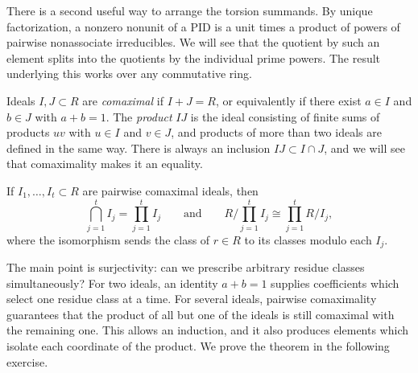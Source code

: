 \documentclass[12pt,reqno]{amsart}
\begin{document}
There is a second useful way to arrange the torsion summands. By unique factorization, a nonzero nonunit of a PID is a unit times a product of powers of pairwise nonassociate irreducibles. We will see that the quotient by such an element splits into the quotients by the individual prime powers. The result underlying this works over any commutative ring.

Ideals $I,J\subset R$ are \emph{comaximal} if $I+J=R$, or equivalently if there exist $a\in I$ and $b\in J$ with $a+b=1$. The \emph{product} $IJ$ is the ideal consisting of finite sums of products $uv$ with $u\in I$ and $v\in J$, and products of more than two ideals are defined in the same way. There is always an inclusion $IJ\subset I\cap J$, and we will see that comaximality makes it an equality.

\begin{theorem}
If $I_1,\ldots,I_t\subset R$ are pairwise comaximal ideals, then
\[
\bigcap_{j=1}^tI_j=\prod_{j=1}^tI_j
\qquad\text{and}\qquad
R\bigg/\prod_{j=1}^tI_j\cong\prod_{j=1}^tR/I_j,
\]
where the isomorphism sends the class of $r\in R$ to its classes modulo each $I_j$.
\end{theorem}

The main point is surjectivity: can we prescribe arbitrary residue classes simultaneously? For two ideals, an identity $a+b=1$ supplies coefficients which select one residue class at a time. For several ideals, pairwise comaximality guarantees that the product of all but one of the ideals is still comaximal with the remaining one. This allows an induction, and it also produces elements which isolate each coordinate of the product. We prove the theorem in the following exercise.

\hrulefill
\end{document}
